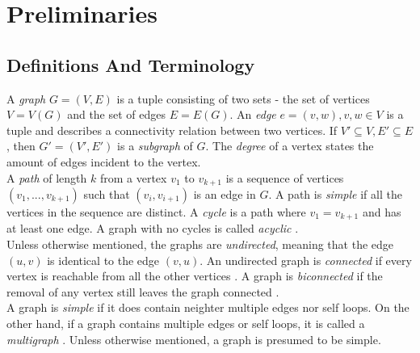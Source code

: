 \section{Preliminaries}\label{section:preliminaries}

\subsection{Definitions And Terminology}
A \emph{graph} $G=(V,E)$ is a tuple consisting of two sets - the set of vertices $V=V(G)$ and the set of edges $E=E(G)$. An \emph{edge} $e = (v,w), v,w \in V$ is a tuple and describes a connectivity relation between two vertices.
If $V'\subseteq V, E'\subseteq E$, then $G' = (V',E')$ is a \emph{subgraph} of $G$.
The \emph{degree} of a vertex states the amount of edges incident to the vertex.\\
A \emph{path} of length $k$ from a vertex $v_1$ to $v_{k+1}$ is a sequence of vertices $(v_1,...,v_{k+1})$ such that $(v_i,v_{i+1})$ is an edge in $G$.  A path is \emph{simple} if all the vertices in the sequence are distinct. A \emph{cycle} is a path where $v_1 = v_{k+1}$ and has at least one edge. A graph with no cycles is called \emph{acyclic} \cite[P. 1170]{DBLP:cormen_intro_to_algorithms}.\\
Unless otherwise mentioned, the graphs are \emph{undirected}, meaning that the edge $(u,v)$ is identical to the edge $(v,u)$.
An undirected graph is \emph{connected} if every vertex is reachable from all the other vertices \cite[P. 1170]{DBLP:cormen_intro_to_algorithms}.
A graph is \emph{biconnected} if the removal of any vertex still leaves the graph connected \cite[P. 224]{Duncan_planar_polyline_drawings}.\\
A graph is \emph{simple} if it does contain neighter multiple edges nor self loops. On the other hand, if a graph contains multiple edges or self loops, it is called a \emph{multigraph} \cite[P. 1172]{DBLP:cormen_intro_to_algorithms}. Unless otherwise mentioned, a graph is presumed to be simple.\\
